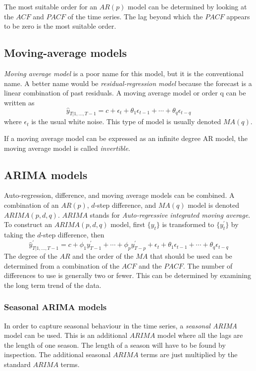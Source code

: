 \documentclass[a4paper,12pt]{article}
\theoremstyle{definition}
\begin{document}
The most suitable order for an $AR(p)$ model can be determined by looking at the $ACF$ and $PACF$ of the time series. The lag beyond which the $PACF$ appears to be zero is the most suitable order.

\subsection{Moving-average models}
\textit{Moving average model} is a poor name for this model, but it is the conventional name. A better name would be \textit{residual-regression model} because the forecast is a linear combination of past residuals. A moving average model or order q can be written as
\begin{equation}
	\hat{y}_{T|1, \dots, T-1} = c + \epsilon_t + \theta_1 \epsilon_{t-1} + \cdots + \theta_q \epsilon_{t-q}
\end{equation}
where $\epsilon_t$ is the usual white noise. This type of model is usually denoted $MA(q)$.

If a moving average model can be expressed as an infinite degree AR model, the moving average model is called \textit{invertible}. 

\subsection{ARIMA models}
Auto-regression, difference, and moving average models can be combined. A combination of an $AR(p)$, $d$-step difference, and $MA(q)$ model is denoted $ARIMA(p,d,q)$. $ARIMA$ stands for \textit{Auto-regressive integrated moving average}. To construct an $ARIMA(p,d,q)$ model, first $\{y_t\}$ is transformed to $\{ y_t^{\prime} \}$ by taking the $d$-step difference, then
\begin{equation}
	\hat{y}_{T|1,\dots,T-1}^{\prime} = c + \phi_1 y_{T-1}^{\prime} + \cdots + \phi_{p} y_{T-p}^{\prime} + \epsilon_t + \theta_{1} \epsilon_{t-1} + \cdots + \theta_{q} \epsilon_{t-q}
\end{equation}
The degree of the $AR$ and the order of the $MA$ that should be used can be determined from a combination of the $ACF$ and the $PACF$. The number of differences to use is generally two or fewer. This can be determined by examining the long term trend of the data.

\subsubsection{Seasonal ARIMA models}
In order to capture seasonal behaviour in the time series, a \textit{seasonal ARIMA} model can be used. This is an additional $ARIMA$ model where all the lags are the length of one season. The length of a season will have to be found by inspection. The additional seasonal $ARIMA$ terms are  just multiplied by the standard $ARIMA$ terms.
\end{document}
